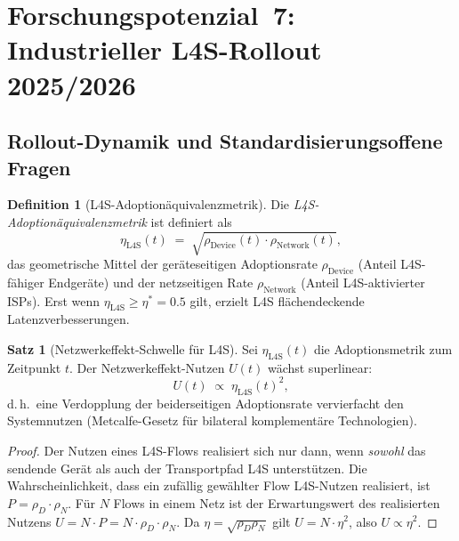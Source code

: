 ﻿\documentclass[a4paper,12pt]{article}
\theoremstyle{definition}
\newtheorem{definition}{Definition}
\newtheorem{satz}{Satz}
\begin{document}
\section{Forschungspotenzial~7: Industrieller L4S-Rollout 2025/2026}

\subsection{Rollout-Dynamik und Standardisierungsoffene Fragen}

\begin{definition}[L4S-Adoption\"{a}quivalenzmetrik]
    Die \emph{L4S-Adoption\"{a}quivalenzmetrik} ist definiert als
    \[
        \eta_{\mathrm{L4S}}(t) \;=\; \sqrt{\rho_{\mathrm{Device}}(t) \cdot \rho_{\mathrm{Network}}(t)},
    \]
    das geometrische Mittel der ger\"{a}teseitigen Adoptionsrate
    $\rho_{\mathrm{Device}}$ (Anteil L4S-f\"{a}higer Endger\"{a}te) und der
    netzseitigen Rate $\rho_{\mathrm{Network}}$ (Anteil L4S-aktivierter ISPs).
    Erst wenn $\eta_{\mathrm{L4S}} \geq \eta^* = 0.5$ gilt, erzielt L4S
    fl\"{a}chendeckende Latenzverbesserungen.
\end{definition}

\begin{satz}[Netzwerkeffekt-Schwelle f\"{u}r L4S]
    \label{satz:rollout}
    Sei $\eta_{\mathrm{L4S}}(t)$ die Adoptionsmetrik zum Zeitpunkt $t$.
    Der Netzwerkeffekt-Nutzen $U(t)$ w\"{a}chst superlinear:
    \[
        U(t) \;\propto\; \eta_{\mathrm{L4S}}(t)^2,
    \]
    d.\,h.\ eine Verdopplung der beiderseitigen Adoptionsrate vervierfacht den
    Systemnutzen (Metcalfe-Gesetz f\"{u}r bilateral komplementäre Technologien).
\end{satz}

\begin{proof}
    Der Nutzen eines L4S-Flows realisiert sich nur dann, wenn \emph{sowohl}
    das sendende Ger\"{a}t als auch der Transportpfad L4S unterst\"{u}tzen. Die
    Wahrscheinlichkeit, dass ein zuf\"{a}llig gew\"{a}hlter Flow L4S-Nutzen realisiert,
    ist $P = \rho_D \cdot \rho_N$. F\"{u}r $N$ Flows in einem Netz ist der
    Erwartungswert des realisierten Nutzens $U = N \cdot P = N \cdot \rho_D \cdot \rho_N$.
    Da $\eta = \sqrt{\rho_D \rho_N}$ gilt $U = N \cdot \eta^2$, also
    $U \propto \eta^2$.
\end{proof}
\end{document}
